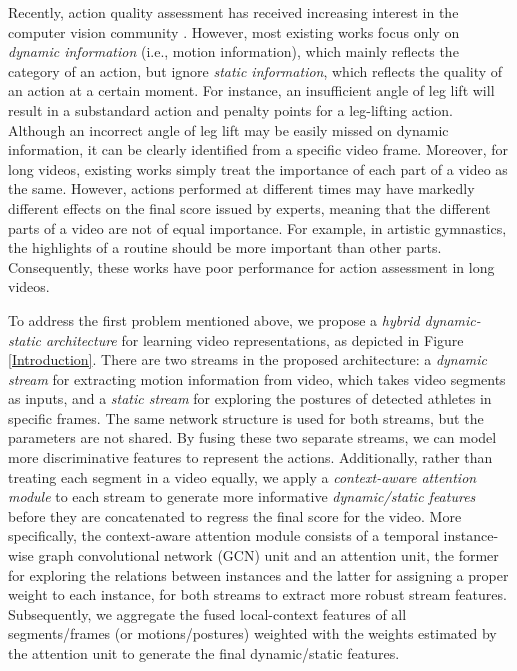 \documentclass[sigconf]{acmart}
\begin{document}
Recently, action quality assessment has received increasing interest in the computer vision community \cite{pirsiavash2014assessing,parmar2017learning,zia2018video,li2018scoringnet,li2018end,doughty2018s,doughty2019pros,xu2019learning,pan2019action}.
However, most existing works \cite{parmar2017learning,li2018scoringnet,li2018end,doughty2018s,doughty2019pros,xu2019learning} focus only on \emph{dynamic information} (i.e., motion information), which mainly reflects the category of an action, but ignore \emph{static information}, which reflects the quality of an action at a certain moment. For instance, an insufficient angle of leg lift will result in a substandard action and penalty points for a leg-lifting action. Although an incorrect angle of leg lift may be easily missed on dynamic information, it can be clearly identified from a specific video frame. 
Moreover, for long videos, existing works \cite{pirsiavash2014assessing, parmar2017learning, zia2018video,doughty2018s,pan2019action} simply treat the importance of each part of a video as the same. However, actions performed at different times may have markedly different effects on the final score issued by experts, meaning that the different parts of a video are not of equal importance. For example, in artistic gymnastics, the highlights of a routine should be more important than other parts. 
Consequently, these works have poor performance for action assessment in long videos.


To address the first problem mentioned above, we propose a \emph{ hybrid dynamic-static architecture} for learning video representations, as depicted in Figure \ref{Introduction}. There are two streams in the proposed architecture: a \emph{dynamic stream} for extracting motion information from video, which takes video segments as inputs, and a \emph{static stream} for exploring the postures of detected athletes in specific frames. The same network structure is used for both streams, but the parameters are not shared. By fusing these two separate streams, we can model more discriminative features to represent the actions. Additionally, rather than treating each segment in a video equally, we apply a \emph{context-aware attention module} to each stream to generate more informative \emph{dynamic/static features} before they are concatenated to regress the final score for the video. More specifically, the context-aware attention module consists of a temporal instance-wise graph convolutional network (GCN) unit and an attention unit, the former for exploring the relations between instances and the latter for assigning a proper weight to each instance, for both streams to extract more robust stream features. Subsequently, we aggregate the fused local-context features of all segments/frames (or motions/postures) weighted with the weights estimated by the attention unit to generate the final dynamic/static features.
\end{document}
